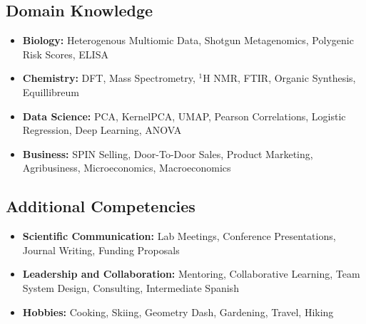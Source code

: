 \documentclass[11pt]{moderncv}
\begin{document}
\subsection{Domain Knowledge}
\begin{itemize}[leftmargin=*]
\item \textbf{Biology:} Heterogenous Multiomic Data, Shotgun Metagenomics, Polygenic Risk Scores, ELISA
\item \textbf{Chemistry:} DFT, Mass Spectrometry, $^1$H NMR, FTIR, Organic Synthesis, Equillibreum
\item \textbf{Data Science:} PCA, KernelPCA, UMAP, Pearson Correlations, Logistic Regression, Deep Learning, ANOVA
\item \textbf{Business:} SPIN Selling, Door-To-Door Sales, Product Marketing, Agribusiness, Microeconomics, Macroeconomics
\end{itemize}
\subsection{Additional Competencies}
\begin{itemize}[leftmargin=*]
\item \textbf{Scientific Communication:} Lab Meetings, Conference Presentations, Journal Writing, Funding Proposals
\item \textbf{Leadership and Collaboration:} Mentoring, Collaborative Learning, Team System Design, Consulting, Intermediate Spanish
\item \textbf{Hobbies:} Cooking, Skiing, Geometry Dash, Gardening, Travel, Hiking
\end{itemize}
\end{document}
